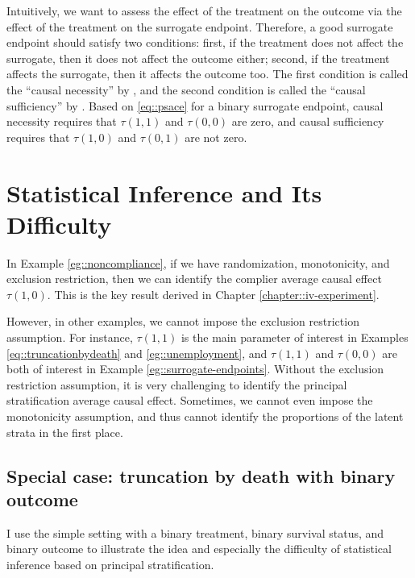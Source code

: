 \begin{example}
Intuitively, we want to assess the effect of the treatment on the outcome via the effect of the treatment on the surrogate endpoint. Therefore, a good surrogate endpoint should satisfy two conditions: first, if the treatment does not affect the surrogate, then it does not affect the outcome either; second, if the treatment affects the surrogate, then it affects the outcome too. The first condition is called the ``causal necessity'' by \citet{frangakis2002principal}, and the second condition is called the ``causal sufficiency'' by \citet{gilbert2008evaluating}. Based on \eqref{eq::psace} for a binary surrogate endpoint, causal necessity requires that $\tau(1,1)$ and $\tau(0,0)$ are zero, and causal sufficiency requires that $\tau(1,0)$ and $\tau(0,1)$ are not zero. 
\end{example}





\section{Statistical Inference and Its Difficulty}
\label{sec::difficulty-of-PS}

In Example \ref{eg::noncompliance}, if we have randomization, monotonicity, and exclusion restriction, then we can identify the complier average causal effect $\tau(1, 0)$. This is the key result derived in Chapter \ref{chapter::iv-experiment}. 


However, in other examples, we cannot impose the exclusion restriction assumption. For instance, $\tau(1,1)$ is the main parameter of interest in Examples \ref{eq::truncationbydeath} and \ref{eg::unemployment}, and $\tau(1,1)$ and $\tau(0,0)$ are both of interest in Example \ref{eg::surrogate-endpoints}. Without the exclusion restriction assumption, it is very challenging to identify the principal stratification average causal effect. Sometimes, we cannot even impose the monotonicity assumption, and thus cannot identify the proportions of the latent strata in the first place. 




\subsection{Special case: truncation by death with binary outcome}
I use the simple setting with a binary treatment, binary survival status, and binary outcome to illustrate the idea and especially the difficulty of statistical inference based on principal stratification.


